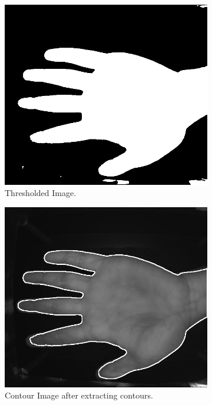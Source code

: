 \begin{enumerate}
    \begin{figure}[!ht]
        \centering
        \begin{subfigure}[t]{0.48\columnwidth}
            \includegraphics[width=\textwidth]{./images/preprocessing/thresholded_image.png}
            \caption{Thresholded Image.} 
            \label{fig:thresholded_image}
        \end{subfigure}
        \hfill
        \begin{subfigure}[t]{0.48\columnwidth}
            \includegraphics[width=\textwidth]{./images/preprocessing/contour_image.png}
            \caption{Contour Image after extracting contours.}
            \label{fig:contour_image}
        \end{subfigure}
        \caption{}
    \end{figure}


\end{enumerate}

